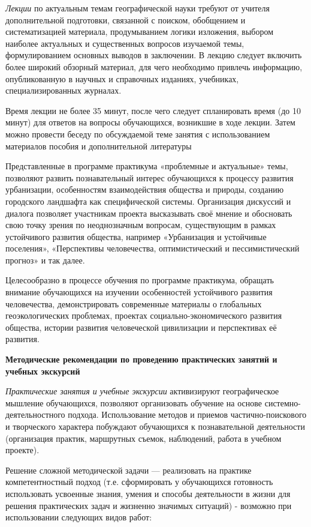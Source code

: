 \documentclass[
  11pt,
  russian,
]{book}
\begin{document}
\emph{Лекции} по актуальным темам географической науки требуют от учителя дополнительной подготовки, связанной с поиском, обобщением и систематизацией материала, продумыванием логики изложения, выбором наиболее актуальных и существенных вопросов изучаемой темы, формулированием основных выводов в заключении. В лекцию следует включить более широкий обзорный материал, для чего необходимо привлечь информацию, опубликованную в научных и справочных изданиях, учебниках, специализированных журналах.

Время лекции не более 35 минут, после чего следует спланировать время (до 10 минут) для ответов на вопросы обучающихся, возникшие в ходе лекции. Затем можно провести беседу по обсуждаемой теме занятия с использованием материалов пособия и дополнительной литературы

Представленные в программе практикума «проблемные и актуальные» темы, позволяют развить познавательный интерес обучающихся к процессу развития урбанизации, особенностям взаимодействия общества и природы, созданию городского ландшафта как специфической системы. Организация дискуссий и диалога позволяет участникам проекта высказывать своё мнение и обосновать свою точку зрения по неоднозначным вопросам, существующим в рамках устойчивого развития общества, например «Урбанизация и устойчивые поселения», «Перспективы человечества, оптимистический и пессимистический прогноз» и так далее.

Целесообразно в процессе обучения по программе практикума, обращать внимание обучающихся на изучении особенностей устойчивого развития человечества, демонстрировать современные материалы о глобальных геоэкологических проблемах, проектах социально-экономического развития общества, истории развития человеческой циви­лизации и перспективах её развития.

\textbf{Методические рекомендации по проведению практических занятий и учебных экскурсий}

\emph{Практические занятия и учебные экскурсии} активизируют географическое мышление обучающихся, позволяют организовать обучение на основе системно-деятельностного подхода. Использование методов и приемов частично-поискового и творческого характера побуждают обучающихся к познавательной деятельности (организация практик, маршрутных съемок, наблюдений, работа в учебном проекте).

Решение сложной методической задачи --- реализовать на практике компетентностный подход (т.е. сформировать у обучающихся готовность использовать усвоенные знания, умения и способы деятельности в жизни для решения практических задач и жизненно значимых ситуаций) - возможно при использовании следующих видов работ:
\end{document}

